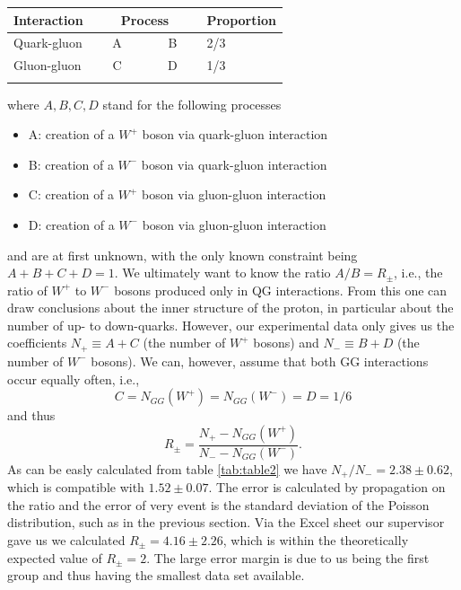 \documentclass[a4paper,10pt]{article}
\begin{document}
\begin{center}
    \begin{tabular}{l|cc|l}
     Interaction & \multicolumn{2}{|c|}{Process}               & Proportion \\ \hline
    Quark-gluon & $\quad$ A $\quad$ & $\quad$ B $\quad$ & 2/3                     \\
    Gluon-gluon & $\quad$ C $\quad$ & $\quad$ D $\quad$ & 1/3                     \\ \vspace{0.25cm}
    \end{tabular}
\end{center}
where $A, B, C, D$ stand for the following processes
\begin{itemize}
\item A: creation of a $W^+$ boson via quark-gluon interaction
\item B: creation of a $W^-$ boson via quark-gluon interaction
\item C: creation of a $W^+$ boson via gluon-gluon interaction
\item D: creation of a $W^-$ boson via gluon-gluon interaction
\end{itemize} 
and are at first unknown, with the only known constraint being $A + B +C+D=1$. We ultimately want to know the ratio $A/B = R_\pm$, i.e., the ratio of $W^+$ to $W^-$ bosons produced only in QG interactions. From this one can draw conclusions about the inner structure of the proton, in particular about the number of up- to down-quarks. 
However, our experimental data only gives us the coefficients $N_+\equiv A+C$ (the number of $W^+$ bosons) and $N_-\equiv B+D$ (the number of $W^-$ bosons). We can, however, assume that both GG interactions occur equally often, i.e.,
\[C = N_{GG}(W^+) = N_{GG}(W^-) = D = 1/6\]
and thus
\[R_\pm = \frac{N_+ - N_{GG}(W^+)}{N_- - N_{GG}(W^-)}.\]
As can be easly calculated from table \ref{tab:table2}  we have $N_+/N_- = 2.38 \pm 0.62$, which is compatible with \cite{ratio} $1.52 \pm 0.07$. The error is calculated by propagation on the ratio and the error of very event is the standard deviation of the Poisson distribution, such as in the previous section. Via the Excel sheet our supervisor gave us we calculated $R_\pm = 4.16\pm 2.26$, which is within the theoretically expected value of $R_\pm = 2$. The large error margin is due to us being the first group and thus having the smallest data set available.
\end{document}
